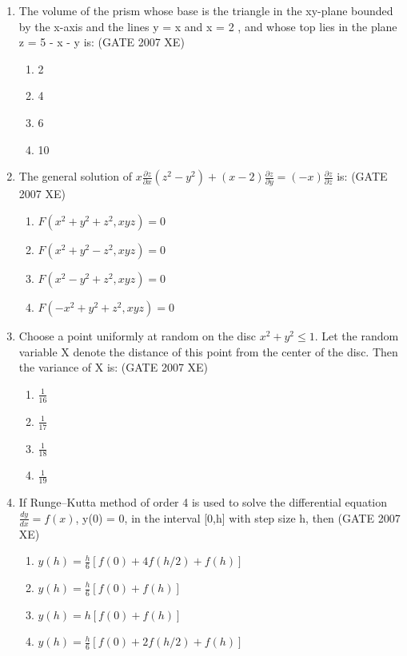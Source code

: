 \documentclass[journal,cmex10]{IEEEtran}
\theoremstyle{remark}
\numberwithin{equation}{enumi}
\numberwithin{figure}{enumi}
\begin{document}
\begin{enumerate}
    \item The volume of the prism whose base is the triangle in the xy-plane bounded by the x-axis and the lines y = x and x = 2 , and whose top lies in the plane z = 5 - x - y is:
    \hfill{(GATE 2007 XE)}
    \begin{enumerate}[label=\alph*)]
        \item 2
        \item 4
        \item 6
        \item 10
    \end{enumerate}

    \item The general solution of $x \frac{\partial z}{\partial x} (z^2 - y^2) + (x - 2) \frac{\partial z}{\partial y} = (-x) \frac{\partial z}{\partial z}$ is:
    \hfill{(GATE 2007 XE)}
    \begin{multicols}{4}
    \begin{enumerate}
        \item $F(x^2 + y^2 + z^2, xyz) = 0$
        \item $F(x^2 + y^2 - z^2, xyz) = 0$
        \item $F(x^2 - y^2 + z^2, xyz) = 0$
        \item $F(-x^2 + y^2 + z^2, xyz) = 0$
    \end{enumerate}
    \end{multicols}

    \item Choose a point uniformly at random on the disc $x^2 + y^2 \leq 1$. Let the random variable X denote the distance of this point from the center of the disc. Then the variance of X is:
    \hfill{(GATE 2007 XE)}
    \begin{multicols}{4}
    \begin{enumerate}
        \item $\frac{1}{16}$
        \item $\frac{1}{17}$
        \item $\frac{1}{18}$
        \item $\frac{1}{19}$
    \end{enumerate}
\end{multicols}

\newpage

    \item If Runge–Kutta method of order 4 is used to solve the differential equation $\frac{dy}{dx} = f(x)$, y(0) = 0, in the interval [0,h] with step size h, then
    \hfill{(GATE 2007 XE)}
    \begin{multicols}{2}
    \begin{enumerate}
        \item $y(h) = \frac{h}{6} [f(0) + 4f(h/2) + f(h)]$
        \vspace{0.1cm}
        \item $y(h) = \frac{h}{6} [f(0) + f(h)]$
        \item $y(h) = h [f(0) + f(h)]$
        \item $y(h) = \frac{h}{6} [f(0) + 2f(h/2) + f(h)]$
    \end{enumerate}
\end{multicols}


\end{enumerate}
\end{document}

